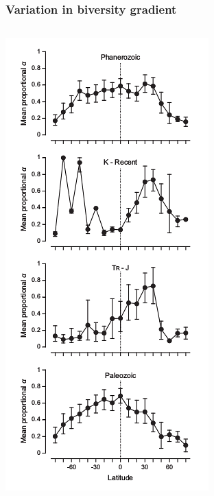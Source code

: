 \documentclass{beamer}
\begin{document}
\begin{frame}
  \frametitle{Variation in biversity gradient}
  \begin{columns}
    \begin{column}{0.4\textwidth}
      \includegraphics[width=\textwidth,height=0.8\textheight,keepaspectratio=true]{figure/powell_2015_b}

\end{column}
\end{columns}
\end{frame}
\end{document}
